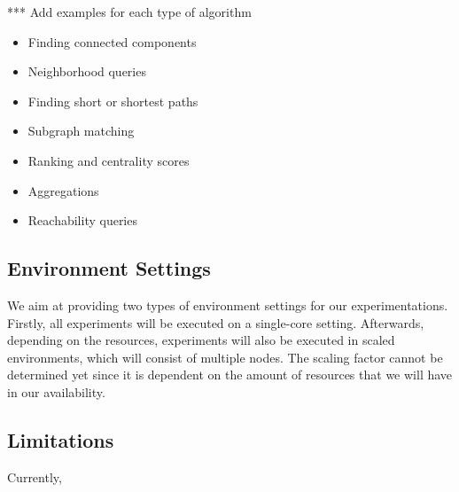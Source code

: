 \documentclass[a4paper,11pt]{article}
\begin{document}
*** Add examples for each type of algorithm

\begin{itemize}
	\item Finding connected components
	\item Neighborhood queries
	\item Finding short or shortest paths
	\item Subgraph matching
	\item Ranking and centrality scores
	\item Aggregations
	\item Reachability queries
\end{itemize}

\subsection{Environment Settings}

\par We aim at providing two types of environment settings for our experimentations. Firstly, all experiments will be executed on a single-core setting. Afterwards, depending on the resources, experiments will also be executed in scaled environments, which will consist of multiple nodes. The scaling factor cannot be determined yet since it is dependent on the amount of resources that we will have in our availability.

\subsection{Limitations} \label{limitations}

Currently, 

\end{document}
